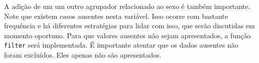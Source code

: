 \documentclass[
]{book}
\newenvironment{Shaded}{\begin{snugshade}}{\end{snugshade}}
\newcommand{\KeywordTok}[1]{\textcolor[rgb]{0.13,0.29,0.53}{\textbf{#1}}}
\newcommand{\NormalTok}[1]{#1}
\newcommand{\OperatorTok}[1]{\textcolor[rgb]{0.81,0.36,0.00}{\textbf{#1}}}
\newcommand{\StringTok}[1]{\textcolor[rgb]{0.31,0.60,0.02}{#1}}
\begin{document}
A adição de um um outro agrupador relacionado ao sexo é também importante. Note que existem casos ausentes nesta variável. Isso ocorre com bastante frequência e há diferentes estratégias para lidar com isso, que serão discutidas em momento oportuno. Para que valores ausentes não sejam apresentados, a função \texttt{filter} será implementada. É importante atentar que os dados ausentes não foram excluídos. Eles apenas não são apresentados.

\begin{Shaded}
\end{Shaded}
\end{document}
